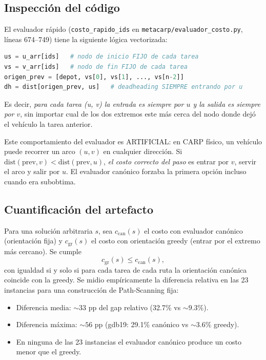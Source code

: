 \subsection{Inspección del código}

El evaluador rápido (\texttt{costo\_rapido\_ids} en
\texttt{metacarp/evaluador\_costo.py}, líneas 674--749) tiene la
siguiente lógica vectorizada:

\begin{lstlisting}[language=Python]
us = u_arr[ids]   # nodo de inicio FIJO de cada tarea
vs = v_arr[ids]   # nodo de fin FIJO de cada tarea
origen_prev = [depot, vs[0], vs[1], ..., vs[n-2]]
dh = dist[origen_prev, us]   # deadheading SIEMPRE entrando por u
\end{lstlisting}

Es decir, \emph{para cada tarea (u, v) la entrada es siempre por $u$ y
la salida es siempre por $v$}, sin importar cual de los dos extremos
este más cerca del nodo donde dejó el vehículo la tarea anterior.

Este comportamiento del evaluador es ARTIFICIAL: en CARP físico, un
vehículo puede recorrer un arco $(u, v)$ en cualquier dirección. Si
$\mathrm{dist}(\text{prev}, v) < \mathrm{dist}(\text{prev}, u)$,
\emph{el costo correcto del paso} es entrar por $v$, servir el arco y
salir por $u$. El evaluador canónico forzaba la primera opción incluso
cuando era subobtima.

\subsection{Cuantificación del artefacto}

Para una solución arbitraria $s$, sea $c_{\text{can}}(s)$ el costo
con evaluador canónico (orientación fija) y $c_{\text{gr}}(s)$ el
costo con orientación greedy (entrar por el extremo más cercano). Se
cumple
\[ c_{\text{gr}}(s) \le c_{\text{can}}(s), \]
con igualdad si y solo si para cada tarea de cada ruta la orientación
canónica coincide con la greedy. Se midio empíricamente la diferencia
relativa en las 23 instancias para una construcción de Path-Scanning
fija:

\begin{itemize}
\item Diferencia media: $\sim 33$ pp del gap relativo (32.7\% vs
  $\sim 9.3\%$).
\item Diferencia máxima: $\sim 56$ pp (gdb19: 29.1\% canónico vs
  $\sim 3.6\%$ greedy).
\item En ninguna de las 23 instancias el evaluador canónico produce
  un costo menor que el greedy.
\end{itemize}

